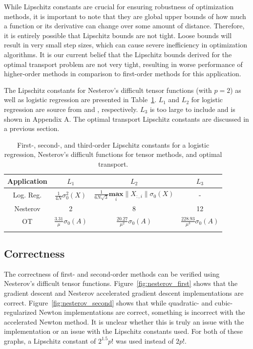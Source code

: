 \documentclass[journal]{IEEEtran}
\begin{document}
While Lipschitz constants are crucial for ensuring robustness of optimization methods, it is important to note that they are global upper bounds of how much a function or its derivative can change over some amount of distance. Therefore, it is entirely possible that Lipschitz bounds are not tight. Loose bounds will result in very small step sizes, which can cause severe inefficiency in optimization algorithms. It is our current belief that the Lipschitz bounds derived for the optimal transport problem are not very tight, resulting in worse performance of higher-order methods in comparison to first-order methods for this application.

The Lipschitz constants for Nesterov's difficult tensor functions (with $p=2$) as well as logistic regression are presented in Table~\ref{tab:lipschitz_constants}. $L_1$ and $L_2$ for logistic regression are source from \cite{logistic_lipschitz_1} and \cite{mishchenko2023regularized}, respectively. $L_3$ is too large to include and is shown in Appendix A. The optimal transport Lipschitz constants are discussed in a previous section.

\begin{table}[]
    \centering
    \begin{tabular}{cccc}
        \textbf{Application} & $L_1$ & $L_2$ & $L_3$ \\
        \hline \hline
        Log. Reg. & $\frac{1}{4N} \sigma^2_0(X)$ & $\frac{1}{6N \sqrt{3}} \underset{i}{\textbf{max}} \|X_{:,i} \| \sigma_0(X)$ & - \\
        Nesterov & 2 & 8 & 12 \\
        OT & $\frac{3.31}{\mu} \sigma_{0}(A)$ & $\frac{20.27}{\mu^2} \sigma_{0}(A)$ & $\frac{228.93}{\mu^3} \sigma_{0}(A)$ \\
        \hline
        \vspace{2mm}
    \end{tabular}
    \caption{First-, second-, and third-order Lipschitz constants for a logistic regression, Nesterov's difficult functions for tensor methods, and optimal transport.}
    \label{tab:lipschitz_constants}
\end{table}

\subsection{Correctness}
The correctness of first- and second-order methods can be verified using Nesterov's difficult tensor functions. Figure~\ref{fig:nesterov_first} shows that the gradient descent and Nesterov accelerated gradient descent implementations are correct. Figure~\ref{fig:nesterov_second} shows that while quadratic- and cubic-regularized Newton implementations are correct, something is incorrect with the accelerated Newton method. It is unclear whether this is truly an issue with the implementation or an issue with the Lipschitz constants used. For both of these graphs, a Lipschitz constant of $2^{1.5} p!$ was used instead of $2 p!$.
\end{document}
